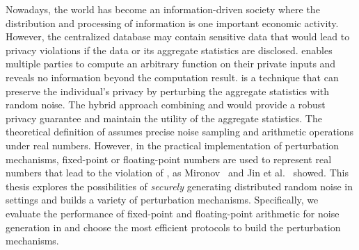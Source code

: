 Nowadays, the world has become an information-driven society where the distribution and processing of information is one important economic activity.
However, the centralized database may contain sensitive data that would lead to privacy violations if the data or its aggregate statistics are disclosed.
\smpc enables multiple parties to compute an arbitrary function on their private inputs and reveals no information beyond the computation result.
\differentialprivacy is a technique that can preserve the individual's privacy by perturbing the aggregate statistics with random noise.
The hybrid approach combining \smpc and \differentialprivacy would provide a robust privacy guarantee and maintain the utility of the aggregate statistics.
The theoretical definition of \differentialprivacy assumes precise noise sampling and arithmetic operations under real numbers. However, in the practical implementation of perturbation mechanisms, fixed-point or floating-point numbers are used to represent real numbers that lead to the violation of \differentialprivacy, as Mironov~\cite{mironov2012significance} and Jin et al.~\cite{jin2022we} showed.
This thesis explores the possibilities of \textit{securely} generating distributed random noise in \smpc settings and builds a variety of perturbation mechanisms. Specifically, we evaluate the performance of fixed-point and floating-point arithmetic for noise generation in \smpc and choose the most efficient \smpc protocols to build the perturbation mechanisms.











